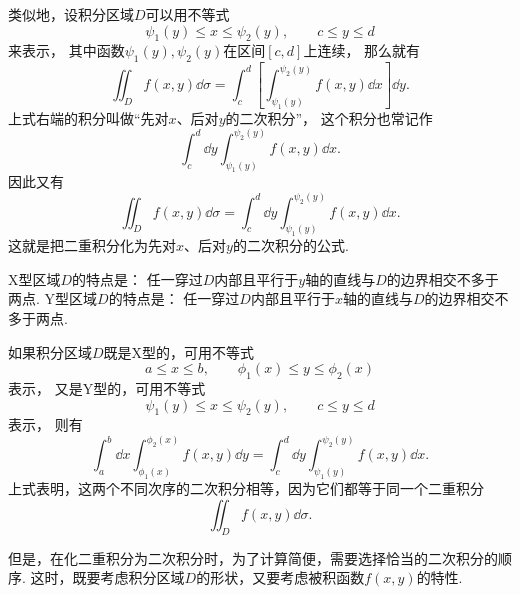 类似地，设积分区域\(D\)可以用不等式\begin{equation*}
	\psi_1(y) \leq x \leq \psi_2(y), \qquad
	c \leq y \leq d
\end{equation*}来表示，
其中函数\(\psi_1(y),\psi_2(y)\)在区间\([c,d]\)上连续，
那么就有\begin{equation*}
	\iint_D f(x,y) \dd{\sigma}
	= \int_c^d \left[ \int_{\psi_1(y)}^{\psi_2(y)} f(x,y) \dd{x} \right] \dd{y}.
\end{equation*}
上式右端的积分叫做“先对\(x\)、后对\(y\)的二次积分”，
这个积分也常记作\begin{equation*}
	\int_c^d \dd{y} \int_{\psi_1(y)}^{\psi_2(y)} f(x,y) \dd{x}.
\end{equation*}
因此又有\begin{equation*}
	\iint_D f(x,y) \dd{\sigma}
	= \int_c^d \dd{y} \int_{\psi_1(y)}^{\psi_2(y)} f(x,y) \dd{x}.
\end{equation*}
这就是把二重积分化为先对\(x\)、后对\(y\)的二次积分的公式.

X型区域\(D\)的特点是：
任一穿过\(D\)内部且平行于\(y\)轴的直线与\(D\)的边界相交不多于两点.
Y型区域\(D\)的特点是：
任一穿过\(D\)内部且平行于\(x\)轴的直线与\(D\)的边界相交不多于两点.

如果积分区域\(D\)既是X型的，可用不等式\begin{equation*}
	a \leq x \leq b, \qquad
	\phi_1(x) \leq y \leq \phi_2(x)
\end{equation*}表示，
又是Y型的，可用不等式\begin{equation*}
	\psi_1(y) \leq x \leq \psi_2(y), \qquad
	c \leq y \leq d
\end{equation*}表示，
则有\begin{equation*}
	\int_a^b \dd{x}
	\int_{\phi_1(x)}^{\phi_2(x)} f(x,y) \dd{y}
	=\int_c^d \dd{y}
	\int_{\psi_1(y)}^{\psi_2(y)} f(x,y) \dd{x}.
\end{equation*}
上式表明，这两个不同次序的二次积分相等，因为它们都等于同一个二重积分\begin{equation*}
	\iint_D f(x,y) \dd{\sigma}.
\end{equation*}

但是，在化二重积分为二次积分时，为了计算简便，需要选择恰当的二次积分的顺序.
这时，既要考虑积分区域\(D\)的形状，又要考虑被积函数\(f(x,y)\)的特性.

